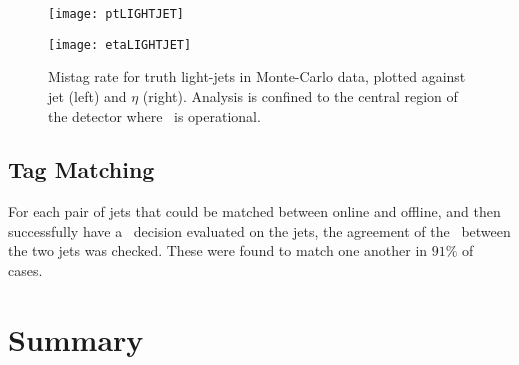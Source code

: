 		\begin{figure}[h]
			\centering
			\begin{minipage}[h]{0.48\linewidth}
				\texttt{[image: ptLIGHTJET]}

			\end{minipage}
			\quad
			\begin{minipage}[h]{0.48\linewidth}
				\texttt{[image: etaLIGHTJET]}
			\end{minipage}
			\caption{Mistag rate for truth light-jets in Monte-Carlo data, plotted against jet \pt (left) and $\eta$ (right). Analysis is confined to the central region of the detector where \btag\, is operational.}
			\label{fig:MC:lightjetefficiency}
		\end{figure}


	\subsection{Tag Matching}

	For each pair of jets that could be matched between online and offline, and then successfully have a \btag\, decision evaluated on the jets, the agreement of the \btag\, between the two jets was checked. These were found to match one another in $91\%$ of cases.

	\section{Summary}


\endinput
